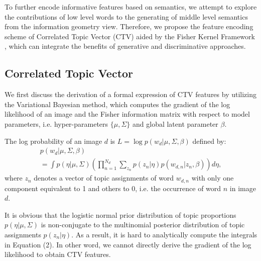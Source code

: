 \documentclass[journal]{IEEEtran}
\begin{document}
To further encode informative features based on semantics, we attempt to explore the contributions of low level words to the generating of middle level semantics from the information geometry view. Therefore, we propose the feature encoding scheme of Correlated Topic Vector (CTV) aided by the Fisher Kernel Framework \cite{zhou2014learning}, which can integrate the benefits of generative and discriminative approaches.

\subsection{Correlated Topic Vector}
We first discuss the derivation of a formal expression of CTV features by utilizing the Variational Bayesian method, which computes the gradient of the log likelihood of an image and the Fisher information matrix with respect to model parameters, i.e. hyper-parameters $\{ \mu,\Sigma \}$ and global latent parameter $\beta$.

The log probability of an image $d$ is $ L = \log p({w_d}|\mu ,\Sigma ,\beta )$ defined by:
\begin{equation}
  \begin{array}{l}
    p({w_d}|\mu ,\Sigma ,\beta )\\
     = \int {p(\eta |\mu ,\Sigma )} (\prod\limits_{n = 1}^{{N_d}} {\sum\limits_{{z_n}} {p({z_n}|\eta )p({w_{d,n}}|{z_n},\beta )} } )d\eta ,
  \end{array}
\end{equation}
where $z_n$ denotes a vector of topic assignments of word $w_{d,n}$ with only one component equivalent to 1 and others to 0, i.e. the occurrence of word $n$ in image $d$.

It is obvious that the logistic normal prior distribution of topic proportions $p(\eta |\mu ,\Sigma )$ is non-conjugate to the multinomial posterior distribution of topic assignments $p({z_n}|\eta )$. As a result, it is hard to analytically compute the integrals in Equation (2). In other word, we cannot directly derive the gradient of the log likelihood to obtain CTV features.
\end{document}
